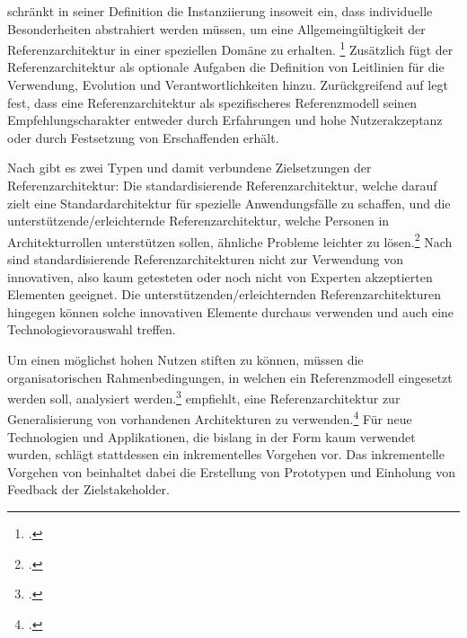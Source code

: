 \citeauthor{Trefke.2012} schränkt in seiner Definition die Instanziierung insoweit ein, dass individuelle Besonderheiten abstrahiert werden müssen, um eine Allgemeingültigkeit der Referenzarchitektur in einer speziellen Domäne zu erhalten.  \footcite[Vgl. auch im Folgenden][]{Trefke.2012} Zusätzlich fügt \citeauthor{Trefke.2012} der Referenzarchitektur als optionale Aufgaben die Definition von Leitlinien für die Verwendung, Evolution und Verantwortlichkeiten hinzu. Zurückgreifend auf \citeauthor{vomBrocke.2003} legt \citeauthor{Trefke.2012} fest, dass eine Referenzarchitektur als spezifischeres Referenzmodell seinen Empfehlungscharakter entweder durch Erfahrungen und hohe Nutzerakzeptanz oder durch Festsetzung von Erschaffenden erhält.

Nach \citeauthor{Angelov.2012} gibt es zwei Typen und damit verbundene Zielsetzungen der Referenzarchitektur: Die standardisierende Referenzarchitektur, welche darauf zielt eine Standardarchitektur für spezielle Anwendungsfälle zu schaffen, und die unterstützende/erleichternde Referenzarchitektur, welche Personen in Architekturrollen unterstützen sollen, ähnliche Probleme leichter zu lösen.\footcite[Vgl. auch im Folgenden][S.~422~ff.]{Angelov.2012} Nach \citeauthor{Angelov.2012} sind standardisierende Referenzarchitekturen nicht zur Verwendung von innovativen, also kaum getesteten oder noch nicht von Experten akzeptierten Elementen geeignet. Die unterstützenden/erleichternden Referenzarchitekturen hingegen können solche innovativen Elemente durchaus verwenden und auch eine Technologievorauswahl treffen.

Um einen möglichst hohen Nutzen stiften zu können, müssen die organisatorischen Rahmenbedingungen, in welchen ein Referenzmodell eingesetzt werden soll, analysiert werden.\footcite[Vgl.][]{vomBrocke.2004}
\citeauthor{Muller.2020} empfiehlt, eine Referenzarchitektur zur Generalisierung von vorhandenen Architekturen zu verwenden.\footcite[Vgl. auch im Folgenden][7]{Muller.2020} Für neue Technologien und Applikationen, die bislang in der Form kaum verwendet wurden, schlägt \citeauthor{Muller.2020} stattdessen ein inkrementelles Vorgehen vor. Das inkrementelle Vorgehen von \citeauthor{Muller.2020} beinhaltet dabei die Erstellung von Prototypen und Einholung von Feedback der Zielstakeholder. 

